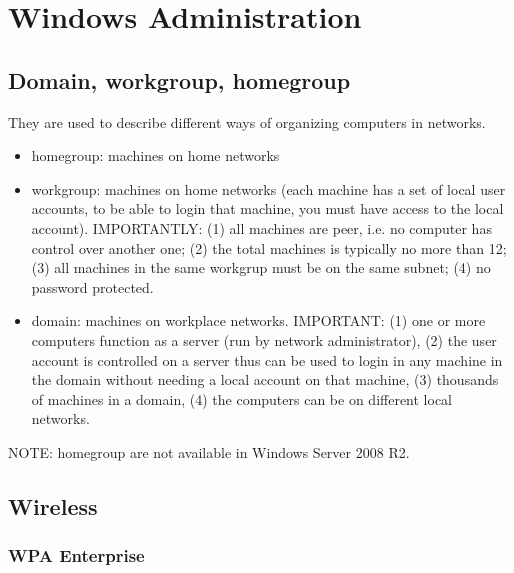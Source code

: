 \chapter{Windows Administration}

\section{Domain, workgroup, homegroup}


They are used to describe different ways of organizing computers in networks. 
\begin{itemize}
  \item homegroup: machines on home networks
  \item workgroup: machines on home networks (each machine has a set of local
  user accounts, to be able to login that machine, you must have access to the
  local account).  IMPORTANTLY: (1)   all machines are peer, i.e. no computer
  has control over another one; (2) the total machines is typically no more than
  12; (3) all machines in the same workgrup must be on the same subnet; (4) no
  password protected.
  
  \item domain: machines on workplace networks. IMPORTANT: (1) one or more
  computers function as a server (run by network administrator), (2) the user
  account is controlled on a server thus can be used to login in any machine in
  the domain without needing a local account on that machine, (3) thousands of
  machines in a domain, (4) the computers can be on different local networks.
\end{itemize}
NOTE: homegroup are not available in Windows Server 2008 R2.

\section{Wireless}

\subsection{WPA Enterprise}

